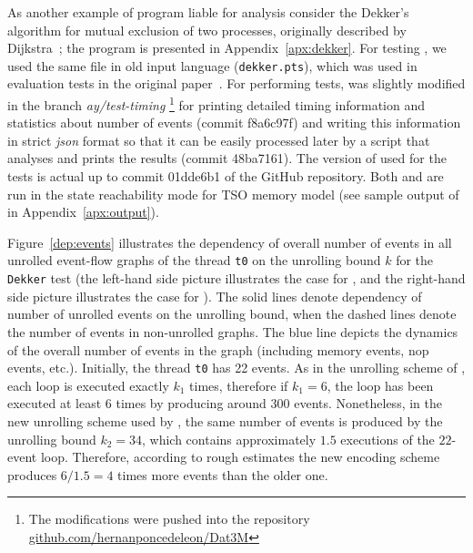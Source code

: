 As another example of program liable for analysis consider the Dekker's algorithm for mutual exclusion of two processes, originally described by Dijkstra~\cite{dijkstra1962over}; the program is presented in Appendix~\ref{apx:dekker}.
For testing \porthos[1], we used the same file in old \porthos{} input language (\texttt{dekker.pts}), which was used in evaluation tests in the original paper~\cite{Porthos17a}.
For performing tests, \porthos[2] was slightly modified in the branch \textit{ay/test-timing}%
\footnote{The modifications were pushed into the \porthos[1] repository \url{github.com/hernanponcedeleon/Dat3M}} %
%
for printing detailed timing information and statistics about number of events (commit f8a6c97f) and writing this information in strict \textit{json} format so that it can be easily processed later by a script that analyses and prints the results (commit 48ba7161).
The version of \porthos[2] used for the tests is actual up to commit 01dde6b1 of the \porthos[2] GitHub repository.
Both \porthos[1] and \porthos[2] are run in the state reachability mode for TSO memory model (see sample output of \porthos[2] in Appendix~\ref{apx:output}).

Figure~\ref{dep:events} illustrates the dependency of overall number of events in all unrolled event-flow graphs of the thread \texttt{t0} on the unrolling bound $k$ for the \texttt{Dekker} test (the left-hand side picture illustrates the case for \porthos[2], and the right-hand side picture illustrates the case for \porthos{}).
The solid lines denote dependency of number of unrolled events on the unrolling bound, when the dashed lines denote the number of events in non-unrolled graphs.
The blue line depicts the dynamics of the overall number of events in the graph (including memory events, nop events, etc.).
Initially, the thread \texttt{t0} has 22 events.
As in the unrolling scheme of \porthos[1], each loop is executed exactly $k_1$ times, therefore if $k_1=6$, the loop has been executed at least 6 times by producing around $300$ events.
Nonetheless, in the new unrolling scheme used by \porthos[2], the same number of events is produced by the unrolling bound $k_2=34$, which contains approximately $1.5$ executions of the $22$-event loop.
Therefore, according to rough estimates the new encoding scheme produces $6/1.5=4$ times more events than the older one.

